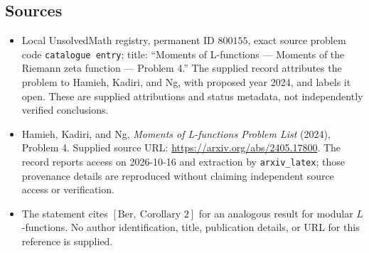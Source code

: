 \documentclass[11pt]{article}
\begin{document}
\subsection{Sources}
\begin{itemize}
\item Local UnsolvedMath registry, permanent ID \(800155\), exact source problem code \texttt{catalogue entry}; title: ``Moments of L-functions --- Moments of the Riemann zeta function --- Problem 4.'' The supplied record attributes the problem to Hamieh, Kadiri, and Ng, with proposed year 2024, and labels it open. These are supplied attributions and status metadata, not independently verified conclusions.
\item Hamieh, Kadiri, and Ng, \emph{Moments of L-functions Problem List} (2024), Problem 4. Supplied source URL: \url{https://arxiv.org/abs/2405.17800}. The record reports access on 2026-10-16 and extraction by \texttt{arxiv\_latex}; those provenance details are reproduced without claiming independent source access or verification.
\item The statement cites \([\mathrm{Ber},\ \text{Corollary }2]\) for an analogous result for modular \(L\)-functions. No author identification, title, publication details, or URL for this reference is supplied.
\end{itemize}
\end{document}
